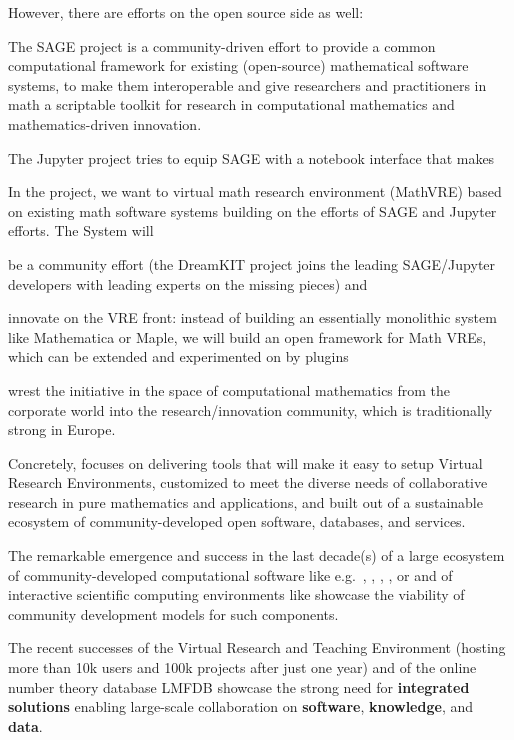 \documentclass[noworkareas,deliverables,keys]{euproposal}                  %
\begin{document}
\begin{proposal}
However, there are efforts on the open source side as well:
\begin{compactitem}
\item The SAGE project is a community-driven effort to provide a common computational
  framework for existing (open-source) mathematical software systems, to make them
  interoperable and give researchers and practitioners in math a scriptable toolkit for
  research in computational mathematics and mathematics-driven innovation.
\item The Jupyter project tries to equip SAGE with a notebook interface that makes
\end{compactitem}
In the \TheProject project, we want to virtual math research environment (MathVRE) based
on existing math software systems building on the efforts of SAGE and Jupyter efforts. The
\TheProject System will
\begin{compactenum}[\em i)\rm]
\item be a community effort (the DreamKIT project joins the leading SAGE/Jupyter
  developers with leading experts on the missing pieces) and
\item innovate on the VRE front: instead of building an essentially monolithic system like
  Mathematica or Maple, we will build an open framework for Math VREs, which can be
  extended and experimented on by plugins
\item wrest the initiative in the space of computational mathematics from the corporate
  world into the research/innovation community, which is traditionally strong in Europe.
\end{compactenum}
      
Concretely, \TheProject focuses on delivering tools that will make it easy to setup
Virtual Research Environments, customized to meet the diverse needs of collaborative
research in pure mathematics and applications, and built out of a sustainable ecosystem
of %
community-developed open software, databases, and services.

The remarkable emergence and success in the last decade(s) of a large ecosystem of
community-developed computational software like e.g.\ \GAP, \Linbox, \PariGP, \Sage, or
\Singular and of interactive scientific computing environments like \IPython showcase the
viability of community development models for such components.

The recent successes of the Virtual Research and Teaching Environment \SMC (hosting more
than 10k users and 100k projects after just one year) and of the online number theory
database LMFDB showcase the strong need for \textbf{integrated solutions} enabling
large-scale collaboration on \textbf{software}, \textbf{knowledge}, and \textbf{data}.


\end{proposal}
\end{document}
